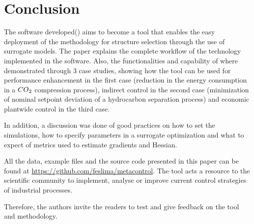 \documentclass[../msc-thesis.tex]{subfiles}
\begin{document}
\chapter{Conclusion}

The software developed(\mtc) aims to become a tool that enables the easy 
deployment of the methodology for \soc structure selection through the use 
of surrogate models. The paper explains the complete workflow of the 
technology implemented in the software. Also, the functionalities 
and capability of \mtc where demonstrated through 3 case studies,
showing how the tool can be used for performance enhancement in the first case 
(reduction in the energy consumption in a $CO\textsubscript{2}$ compression 
process), indirect control in the second case (minimization of nominal setpoint 
deviation of a hydrocarbon separation process) and economic plantwide control 
in the third case.

In addition, a discussion was done of good practices on how to set the 
simulations, how to specify parameters in a surrogate optimization and what to 
expect of metrics used to estimate gradients and Hessian.

All the data, example files and the \mtc source code presented 
in this paper can be found at \url{https://github.com/feslima/metacontrol}. The 
tool acts a resource to the scientific community to implement, analyse or 
improve current control strategies of industrial processes.

Therefore, the authors invite the readers to test and give feedback on the tool 
and methodology.
\end{document}
